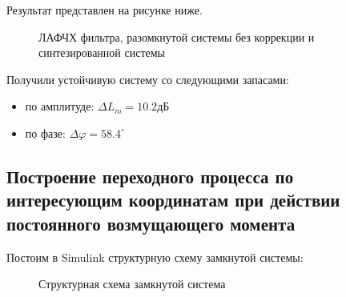 \documentclass[main.tex]{subfiles}
\begin{document}
 Результат представлен на рисунке ниже.
 \begin{figure}[h]
     \caption{ЛАФЧХ фильтра, разомкнутой системы без коррекции и синтезированной
     системы}
 \end{figure}

 Получили устойчивую систему со следующими запасами:
\begin{itemize}
    \item по амплитуде: \( \Delta L_m = 10.2 \text{дБ} \)
    \item по фазе: \( \Delta \varphi = 58.4^\circ \)
\end{itemize}

\subsection{Построение переходного процесса по интересующим координатам при
действии постоянного возмущающего момента}
Постоим в Simulink структурную схему замкнутой системы:
\begin{figure}[h]
    \caption{Структурная схема замкнутой система}
\end{figure}
\end{document}
